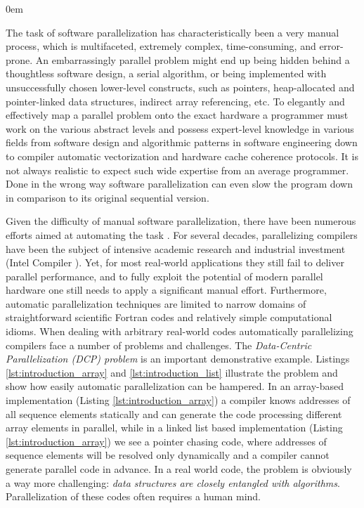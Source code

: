 \begin{description}[style=unboxed,leftmargin=0cm]
\itemsep0em
\item[\textit{Manual parallelization challenges}] The task of software parallelization has characteristically been a very manual process, which is multifaceted, extremely complex, time-consuming, and error-prone. An embarrassingly parallel problem might end up being hidden behind a thoughtless software design, a serial algorithm, or being implemented with unsuccessfully chosen lower-level constructs, such as pointers, heap-allocated and pointer-linked data structures, indirect array referencing, etc. To elegantly and effectively map a parallel problem onto the exact hardware a programmer must work on the various abstract levels and possess expert-level knowledge in various fields from software design and algorithmic patterns in software engineering down to compiler automatic vectorization and hardware cache coherence protocols. It is not always realistic to expect such wide expertise from an average programmer. Done in the wrong way software parallelization can even slow the program down in comparison to its original sequential version.
\item[\textit{Automatic parallelization limitations}] Given the difficulty of manual software parallelization, there have been numerous efforts aimed at automating the task \cite{Bacon:1994:CTH:197405.197406}. For several decades, parallelizing compilers have been the subject of intensive academic research \cite{6813266} and industrial investment (Intel Compiler \cite{icc-compiler}). Yet, for most real-world applications they still fail to deliver parallel performance, and to fully exploit the potential of modern parallel hardware one still needs to apply a significant manual effort. Furthermore, automatic parallelization techniques are limited to narrow domains of straightforward scientific Fortran codes and relatively simple computational idioms. When dealing with arbitrary real-world codes automatically parallelizing compilers face a number of problems and challenges. The \textit{Data-Centric Parallelization (DCP) problem} is an important demonstrative example. Listings \ref{lst:introduction_array} and \ref{lst:introduction_list} illustrate the problem and show how easily automatic parallelization can be hampered. In an array-based implementation (Listing \ref{lst:introduction_array}) a compiler knows addresses of all sequence elements statically and can generate the code processing different array elements in parallel, while in a linked list based implementation (Listing \ref{lst:introduction_array}) we see a pointer chasing code, where addresses of sequence elements will be resolved only dynamically and a compiler cannot generate parallel code in advance. In a real world code, the problem is obviously a way more challenging: \textit{data structures are closely entangled with algorithms}. Parallelization of these codes often requires a human mind.\newline\null

\end{description}
